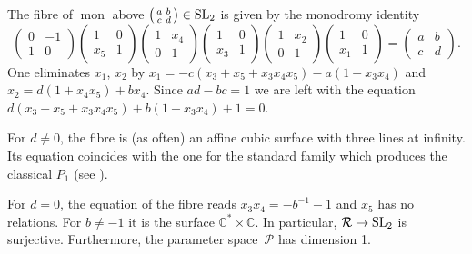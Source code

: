 \documentclass[pdftex]{sigma}
\numberwithin{equation}{section}
\begin{document}
 The fibre of $\operatorname{mon}$ above $\bigl(\begin{smallmatrix}a& b\\c& d\end{smallmatrix}\bigr)\in {\rm SL}_2$ is given by the
 monodromy identity
 \[ \begin{pmatrix}0& -1\\1&0 \end{pmatrix}\begin{pmatrix} 1& 0\\x_5& 1 \end{pmatrix}\begin{pmatrix}1& x_4\\0& 1\end{pmatrix}\begin{pmatrix}1& 0\\x_3& 1 \end{pmatrix}
\begin{pmatrix}1& x_2\\0& 1 \end{pmatrix}\begin{pmatrix}1& 0\\x_1& 1\end{pmatrix}= \begin{pmatrix}a& b\\c& d \end{pmatrix}. \]
One eliminates $x_1$, $x_2$ by $x_1=-c(x_3+x_5+x_3x_4x_5)-a(1+x_3x_4)$ and $x_2=d(1+x_4x_5)+bx_4$.
Since $ad-bc=1$ we are left with the equation $ d(x_3+x_5+x_3x_4x_5)+b(1+x_3x_4)+1=0$.

For $d\neq 0$, the fibre is (as often) an affine cubic surface with three lines at infinity. Its equation coincides with the one for the
standard family which produces the classical $P_1$ (see \cite[Section~3.10]{vdP-Sa}).

For $d=0$, the equation of the fibre reads $x_3x_4=-b^{-1}-1$ and $x_5$ has no relations.
For $b\neq -1$ it is the surface $\mathbb{C}^*\times \mathbb{C}$. In particular, $\mathcal{R}\rightarrow {\rm SL}_2$ is surjective. Furthermore, the parameter space~$\mathcal{P}$ has dimension 1.
\end{document}
